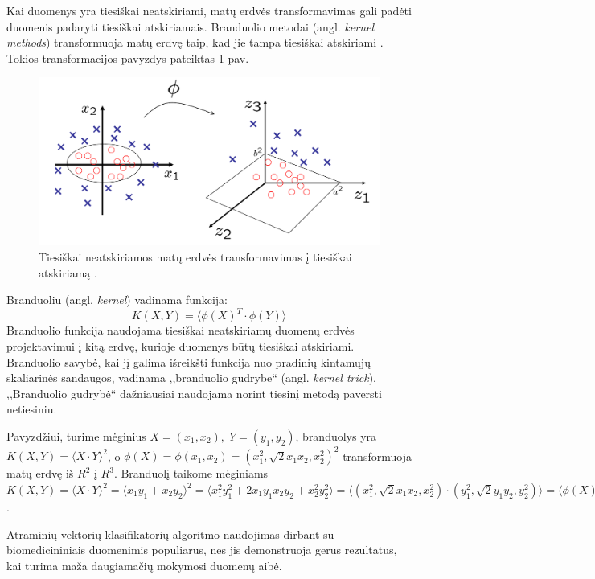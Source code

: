 Kai duomenys yra tiesiškai neatskiriami, matų erdvės transformavimas gali padėti duomenis padaryti tiesiškai atskiriamais. Branduolio metodai (angl. \textit{kernel methods}) transformuoja matų erdvę taip, kad jie tampa tiesiškai atskiriami \cite{aizerman1964theoretical}. Tokios transformacijos pavyzdys pateiktas \ref{fig:matu_erdves_transformavimas} pav. %
\begin{figure}
 \centering
 \includegraphics[width=.7\textwidth]{images/matu_erdves_transformavimas.png}
 \caption{Tiesiškai neatskiriamos matų erdvės transformavimas į tiesiškai atskiriamą \cite{non_separable}.}
 \label{fig:matu_erdves_transformavimas}
\end{figure}

Branduoliu (angl. \textit{kernel}) vadinama funkcija:
\begin{equation}
 \label{kernel}
 K(X, Y) = \langle \phi(X)^T \cdot \phi(Y) \rangle
\end{equation}
Branduolio funkcija naudojama tiesiškai neatskiriamų duomenų erdvės projektavimui į kitą erdvę, kurioje duomenys būtų tiesiškai atskiriami. 
Branduolio savybė, kai jį galima išreikšti funkcija nuo pradinių kintamųjų skaliarinės sandaugos, vadinama ,,branduolio gudrybe`` (angl. \textit{kernel trick}). ,,Branduolio gudrybė`` dažniausiai naudojama norint tiesinį metodą paversti netiesiniu. 

Pavyzdžiui, turime mėginius $X=(x_1, x_2),\; Y=(y_1, y_2)$, branduolys yra $K(X, Y)=\langle X \cdot Y \rangle ^ 2$, o $\phi(X)=\phi(x_1, x_2)=(x_1^2, \sqrt{2}x_1x_2, x_2^2)^2$ transformuoja matų erdvę iš $R^2$ į $R^3$. Branduolį taikome mėginiams $K(X, Y) = \langle X \cdot Y \rangle ^ 2 = \langle x_1y_1 + x_2y_2\rangle ^ 2 = \langle x_1^2y_1^2 + 2x_1y_1x_2y_2 + x_2^2y_2^2 \rangle = \langle (x_1^2, \sqrt{2}x_1x_2, x_2^2) \cdot (y_1^2, \sqrt{2}y_1y_2, y_2^2) \rangle = \langle \phi(X) \cdot \phi(Y) \rangle$.

Atraminių vektorių klasifikatorių algoritmo naudojimas dirbant su biomedicininiais duomenimis populiarus, nes jis demonstruoja gerus rezultatus, kai turima maža daugiamačių mokymosi duomenų aibė. 

